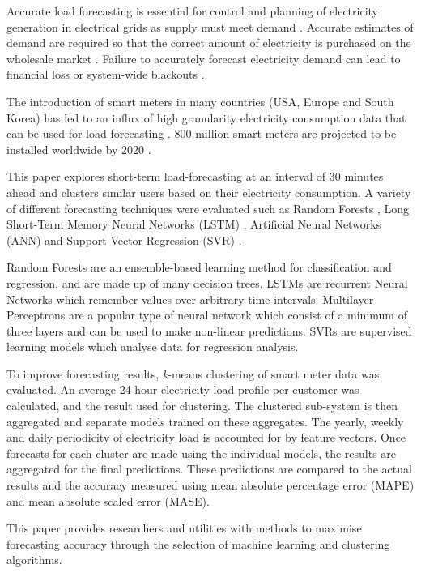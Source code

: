Accurate load forecasting is essential for control and planning of electricity generation in electrical grids as supply must meet demand \cite{Lu1993}. Accurate estimates of demand are required so that the correct amount of electricity is purchased on the wholesale market \cite{Dillon1991}. Failure to accurately forecast electricity demand can lead to financial loss or system-wide blackouts \cite{Hines2008}.

The introduction of smart meters in many countries (USA, Europe and South Korea) has led to an influx of high granularity electricity consumption data that can be used for load forecasting \cite{Depuru2011a}. 800 million smart meters are projected to be installed worldwide by 2020 \cite{Telefonica2014}. 

This paper explores short-term load-forecasting at an interval of 30 minutes ahead and clusters similar users based on their electricity consumption. A variety of different forecasting techniques were evaluated such as Random Forests \cite{TinKamHo}, Long Short-Term Memory Neural Networks (LSTM) \cite{lstm}, Artificial Neural Networks \cite{book:984557} (ANN) and Support Vector Regression (SVR) \cite{Drucker1997}. 

Random Forests are an ensemble-based learning method for classification and regression, and are made up of many decision trees. LSTMs are recurrent Neural Networks which remember values over arbitrary time intervals. Multilayer Perceptrons are a popular type of neural network which consist of a minimum of three layers and can be used to make non-linear predictions. SVRs are supervised learning models which analyse data for regression analysis.

To improve forecasting results, \textit{k}-means clustering of smart meter data was evaluated. An average 24-hour electricity load profile per customer was calculated, and the result used for clustering. The clustered sub-system is then aggregated and separate models trained on these aggregates. The yearly, weekly and daily periodicity of electricity load is accounted for by feature vectors. Once forecasts for each cluster are made using the individual models, the results are aggregated for the final predictions. These predictions are compared to the actual results and the accuracy measured using mean absolute percentage error (MAPE) and mean absolute scaled error (MASE).

This paper provides researchers and utilities with methods to maximise forecasting accuracy through the selection of machine learning and clustering algorithms.

